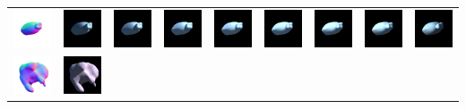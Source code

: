 \begin{center}
\begin{longtable}{@{}c@{}c@{}c@{}c@{}c@{}c@{}c@{}c@{}c@{}}
\includegraphics[width=0.1\linewidth]{training/14_gt.png} & \includegraphics[width=0.1\linewidth]{training/14_0.png} &
\includegraphics[width=0.1\linewidth]{training/14_1.png} & \includegraphics[width=0.1\linewidth]{training/14_2.png} &
\includegraphics[width=0.1\linewidth]{training/14_3.png} & \includegraphics[width=0.1\linewidth]{training/14_4.png} &
\includegraphics[width=0.1\linewidth]{training/14_5.png} & \includegraphics[width=0.1\linewidth]{training/14_6.png} &
\includegraphics[width=0.1\linewidth]{training/14_7.png} \\
\includegraphics[width=0.1\linewidth]{training/15_gt.png} & \includegraphics[width=0.1\linewidth]{training/15_0.png} &

\end{longtable}
\end{center}

